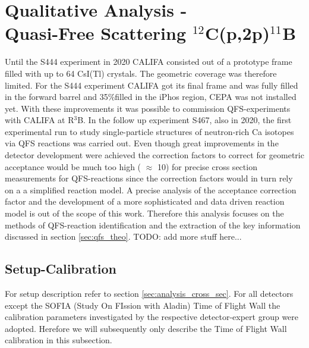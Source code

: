 \section{Qualitative Analysis - \\Quasi-Free Scattering $^{12}$C(p,2p)$^{11}$B}
Until the S444 experiment in 2020 CALIFA consisted out of a prototype frame filled with up to 64 CsI(Tl) crystals. The geometric coverage was therefore limited. For the S444 experiment CALIFA got its final frame and was fully filled in the forward barrel and 35\%filled in the iPhos region, CEPA was not installed yet. With these improvements it was possible to commission QFS-experiments with CALIFA at R$^3$B. In the follow up experiment S467, also in 2020, the first experimental run to study single-particle structures of neutron-rich Ca isotopes via QFS reactions was carried out.\newline
Even though great improvements in the detector development  were achieved the correction factors to correct for geometric acceptance would be much too high ( $\approx$ 10) for precise cross section measurements for QFS-reactions since the correction factors would in turn rely on a a simplified reaction model. A precise analysis of the acceptance correction factor and the development of a more sophisticated and data driven reaction model is out of the scope of this work. Therefore this analysis focuses on the methods of QFS-reaction identification and the extraction of the key information discussed in section \ref{sec:qfs_theo}. TODO: add more stuff here...\newline
\subsection{Setup-Calibration}
For setup description refer to section \ref{sec:analysis_cross_sec}. For all detectors except the SOFIA (Study On FIssion with Aladin) Time of Flight Wall the calibration parameters investigated by the respective detector-expert group were adopted. Herefore we will subsequently only describe the Time of Flight Wall calibration in this subsection.
